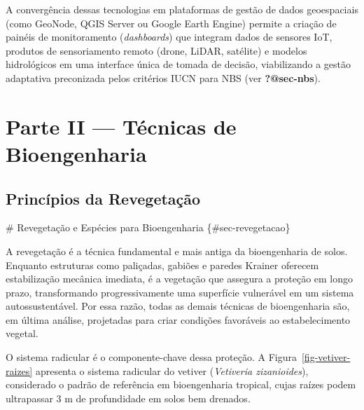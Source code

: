\documentclass[
  portuguese,
  11pt,
  a4paper,
  open=any]{scrbook}
\begin{document}
\begin{tcolorbox}[enhanced jigsaw, leftrule=.75mm, colframe=quarto-callout-note-color-frame, colback=white, bottomrule=.15mm, opacityback=0, colbacktitle=quarto-callout-note-color!10!white, breakable, bottomtitle=1mm, opacitybacktitle=0.6, title=\textcolor{quarto-callout-note-color}{\faInfo}\hspace{0.5em}{Integração de dados}, titlerule=0mm, toprule=.15mm, toptitle=1mm, rightrule=.15mm, left=2mm, arc=.35mm, coltitle=black]

A convergência dessas tecnologias em plataformas de gestão de dados
geoespaciais (como GeoNode, QGIS Server ou Google Earth Engine) permite
a criação de painéis de monitoramento (\emph{dashboards}) que integram
dados de sensores IoT, produtos de sensoriamento remoto (drone, LiDAR,
satélite) e modelos hidrológicos em uma interface única de tomada de
decisão, viabilizando a gestão adaptativa preconizada pelos critérios
IUCN para NBS (ver \textbf{?@sec-nbs}).

\end{tcolorbox}

\part{Parte II --- Técnicas de Bioengenharia}

\chapter{Princípios da
Revegetação}\label{princuxedpios-da-revegetauxe7uxe3o}

\# Revegetação e Espécies para Bioengenharia \{\#sec-revegetacao\}

A revegetação é a técnica fundamental e mais antiga da bioengenharia de
solos. Enquanto estruturas como paliçadas, gabiões e paredes Krainer
oferecem estabilização mecânica imediata, é a vegetação que assegura a
proteção em longo prazo, transformando progressivamente uma superfície
vulnerável em um sistema autossustentável. Por essa razão, todas as
demais técnicas de bioengenharia são, em última análise, projetadas para
criar condições favoráveis ao estabelecimento vegetal.

O sistema radicular é o componente-chave dessa proteção. A
Figura~\ref{fig-vetiver-raizes} apresenta o sistema radicular do vetiver
(\emph{Vetiveria zizanioides}), considerado o padrão de referência em
bioengenharia tropical, cujas raízes podem ultrapassar 3 m de
profundidade em solos bem drenados.
\end{document}
